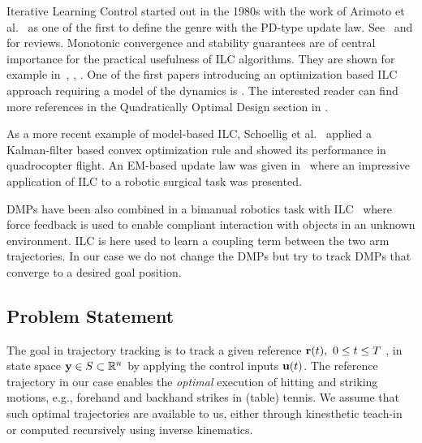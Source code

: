 Iterative Learning Control started out in the 1980s with the work of Arimoto et al.~\cite{Arimoto84} as one of the first to define the genre with the PD-type update law. See~\cite{Bristow06} and \cite{Moore99} for reviews. Monotonic convergence and stability guarantees are of central importance for the practical usefulness of ILC algorithms. They are shown for example in~\cite{Bristow06}, \cite{Norrloef02}, \cite{Longman2000}. One of the first papers introducing an optimization based ILC approach requiring a model of the dynamics is \cite{Amann95}. The interested reader can find more references in the Quadratically Optimal Design section in \cite{Bristow06}.

As a more recent example of model-based ILC, Schoellig et al.~\cite{Schoellig12} applied a Kalman-filter based convex optimization rule and showed its performance in quadrocopter flight. An EM-based update law was given in~\cite{Berg10} where an impressive application of ILC to a robotic surgical task was presented.

DMPs have been also combined in a bimanual robotics task with ILC~\cite{Gams13} where force feedback is used to enable compliant interaction with objects in an unknown environment. ILC is here used to learn a coupling term between the two arm trajectories. In our case we do not change the DMPs but try to track DMPs that converge to a desired goal position.

\subsection{Problem Statement}\label{problemStatement}

The goal in trajectory tracking is to track a given reference $\boldsymbol{\mathrm{r}}(t), \ 0 \leq t \leq T \ $, in state space $\boldsymbol{\mathrm{y}} \in S \subset \mathbb{R}^{n}$ by applying the control inputs $\boldsymbol{\mathrm{u}}(t)$. The reference trajectory in our case enables the \emph{optimal} execution of hitting and striking motions, e.g., forehand and backhand strikes in (table) tennis. We assume that such optimal trajectories are available to us, either through kinesthetic teach-in or computed recursively using inverse kinematics.

